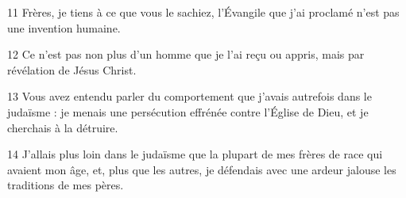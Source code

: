 
11 Frères, je tiens à ce que vous le sachiez, l’Évangile que j’ai proclamé n’est pas une invention humaine.

12 Ce n’est pas non plus d’un homme que je l’ai reçu ou appris, mais par révélation de Jésus Christ.

13 Vous avez entendu parler du comportement que j’avais autrefois dans le judaïsme : je menais une persécution effrénée contre l’Église de Dieu, et je cherchais à la détruire.

14 J’allais plus loin dans le judaïsme que la plupart de mes frères de race qui avaient mon âge, et, plus que les autres, je défendais avec une ardeur jalouse les traditions de mes pères.